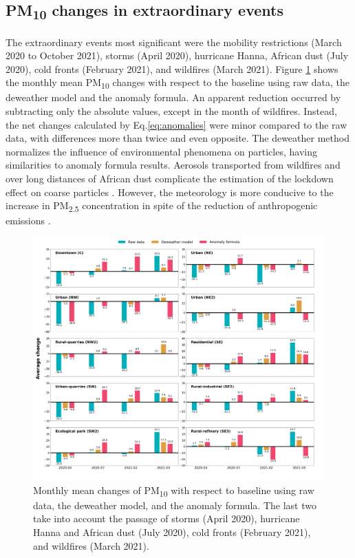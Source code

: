 \documentclass[preprint,12pt]{elsarticle}
\begin{document}
\subsection{PM\textsubscript{10} changes in extraordinary events}
The extraordinary events most significant were the mobility restrictions (March 2020 to October 2021), storms (April 2020), hurricane Hanna, African dust (July 2020), cold fronts (February 2021), and wildfires (March 2021). Figure \ref{fig:average_change_deweather_fourier} shows the monthly mean PM\textsubscript{10} changes with respect to the baseline using raw data, the deweather model and the anomaly formula. An apparent reduction occurred by subtracting only the absolute values, except in the month of wildfires. Instead, the net changes calculated by Eq.\ref{eq:anomalies} were minor compared to the raw data, with differences more than twice and even opposite. The deweather method normalizes the influence of environmental phenomena on particles, having similarities to anomaly formula results. Aerosols transported from wildfires and over long distances of African dust complicate the estimation of the lockdown effect on coarse particles \citep{Conte_2023}. However, the meteorology is more conducive to the increase in PM\textsubscript{2.5} concentration in spite of the reduction of anthropogenic emissions \citep{Liu_2022}.
\begin{figure}[ht!]
	\centering
	\includegraphics[width=\linewidth]{figures/average_change_deweather_fourier.png}
	\caption{Monthly mean changes of PM\textsubscript{10} with respect to baseline using raw data, the deweather model, and the anomaly formula. The last two take into account the passage of storms (April 2020), hurricane Hanna and African dust (July 2020), cold fronts (February 2021), and wildfires (March 2021).
	}
	\label{fig:average_change_deweather_fourier}
\end{figure}
\end{document}
